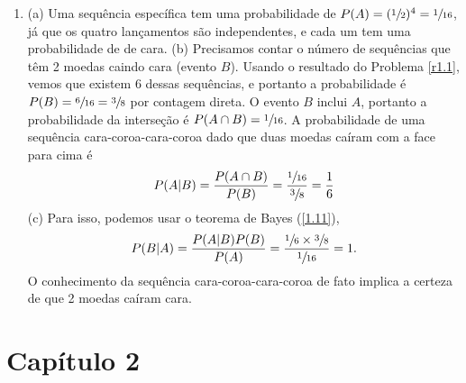 \begin{enumerate}[label=\textbf{1.\arabic*.}]
\item (a) Uma sequência específica tem uma probabilidade de $P(A) = (\sfrac{1}{2})^4 = \sfrac{1}{16}$, já que os quatro lançamentos são independentes, e cada um tem uma probabilidade de  de cara. (b) Precisamos contar o número de sequências que têm 2 moedas caindo cara (evento $B$). Usando o resultado do Problema \ref{r1.1}, vemos que existem 6 dessas sequências, e portanto a probabilidade é $P(B) = \sfrac{6}{16} = \sfrac{3}{8}$ por contagem direta. O evento $B$ inclui $A$, portanto a probabilidade da interseção é $P(A \cap B) = \sfrac{1}{16}$. A probabilidade de uma sequência cara-coroa-cara-coroa dado que duas moedas caíram com a face para cima é
\begin{equation*}
P(A|B) = \dfrac{P(A \cap B)}{P(B)} = \dfrac{\sfrac{1}{16}}{\sfrac{3}{8}} = \dfrac{1}{6}
\end{equation*}
(c) Para isso, podemos usar o teorema de Bayes (\autoref{1.11}), 
\begin{equation*}
P(B | A) = \dfrac{P(A | B)P(B)}{P(A)} = \dfrac{\sfrac{1}{6}\times\sfrac{3}{8}}{\sfrac{1}{16}} = 1. 
\end{equation*}
O conhecimento da sequência cara-coroa-cara-coroa de fato implica a certeza de que 2 moedas caíram cara.
\end{enumerate}


\section*{Capítulo 2}

